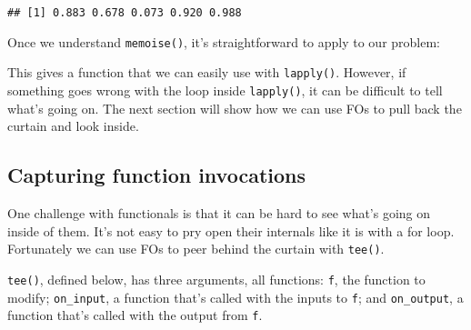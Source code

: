 \begin{verbatim}
## [1] 0.883 0.678 0.073 0.920 0.988
\end{verbatim}

Once we understand \texttt{memoise()}, it's straightforward to apply to
our problem:

\begin{Shaded}
\begin{Highlighting}[]
\StringTok{ }\NormalTok{(}\NormalTok{, }\NormalTok{(}\NormalTok{(}
\end{Highlighting}
\end{Shaded}

This gives a function that we can easily use with \texttt{lapply()}.
However, if something goes wrong with the loop inside \texttt{lapply()},
it can be difficult to tell what's going on. The next section will show
how we can use FOs to pull back the curtain and look inside.

\hypertarget{tee}{%
\subsection{Capturing function invocations}\label{tee}}

One challenge with functionals is that it can be hard to see what's
going on inside of them. It's not easy to pry open their internals like
it is with a for loop. Fortunately we can use FOs to peer behind the
curtain with \texttt{tee()}. 

\texttt{tee()}, defined below, has three arguments, all functions:
\texttt{f}, the function to modify; \texttt{on\_input}, a function
that's called with the inputs to \texttt{f}; and \texttt{on\_output}, a
function that's called with the output from \texttt{f}.

\begin{Shaded}
\begin{Highlighting}[]
\StringTok{ }
\StringTok{ }
\StringTok{ }
\NormalTok{  \}}
\NormalTok{\}}
\end{Highlighting}
\end{Shaded}

